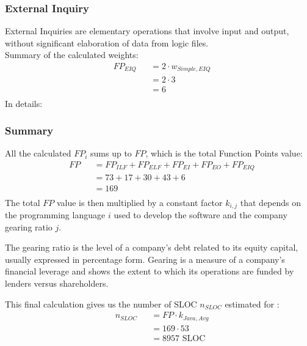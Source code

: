 \subsubsection{External Inquiry}
External Inquiries are elementary operations that involve input and output, without significant elaboration of data from logic files.\\
Summary of the calculated weights:
\begin{equation*}
	\begin{aligned}
		&	FP_{EIQ}
		& & = 2 \cdot w_{Simple,EIQ}\\
		&&& = 2 \cdot 3\\
		&&& = 6\\
	\end{aligned}
\end{equation*}
In details:
\begin{itemize}
\end{itemize}
%
\subsubsection{Summary}
All the calculated $FP_{i}$ sums up to $FP$, which is the total Function Points value:
\begin{equation*}
	\begin{aligned}
		&	FP
		& & = FP_{ILF} + FP_{ELF} + FP_{EI} + FP_{EO} + FP_{EIQ}\\
		&&& = 73 + 17 + 30 + 43 + 6\\
		&&& = 169\\	
	\end{aligned}
\end{equation*}
The total $FP$ value is then multiplied by a constant factor $k_{i,j}$ that depends on the programming language $i$ used to develop the software and the company gearing ratio $j$.\par
The gearing ratio is the level of a company's debt related to its equity capital, usually expressed in percentage form.
Gearing is a measure of a company's financial leverage and shows the extent to which its operations are funded by lenders versus shareholders.\par
This final calculation gives us the number of SLOC $n_{SLOC}$ estimated for \myTaxiService{}:
\begin{equation*}
	\begin{aligned}
		&   n_{SLOC}
		& & = FP \cdot k_{Java, Avg}\\
		&&& = 169 \cdot 53\\
		&&& = 8957 \text{ SLOC}
	\end{aligned}
\end{equation*}
%

